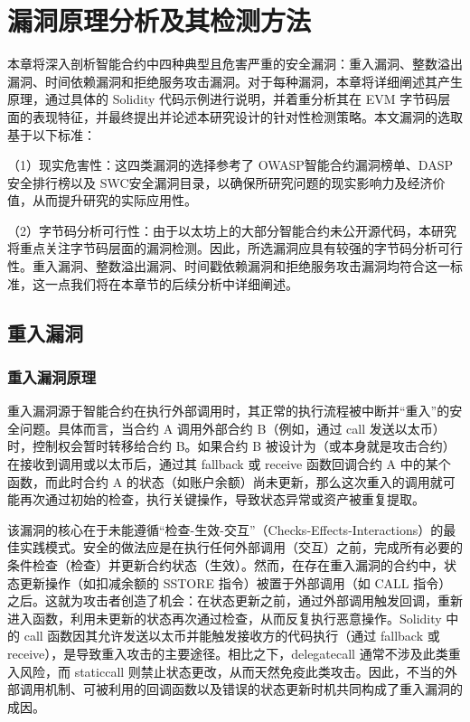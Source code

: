 \documentclass[print, master, vlined, timesmath]{DissertUESTC}
\begin{document}
\chapter{漏洞原理分析及其检测方法}
本章将深入剖析智能合约中四种典型且危害严重的安全漏洞：重入漏洞、整数溢出漏洞、时间依赖漏洞和拒绝服务攻击漏洞。对于每种漏洞，本章将详细阐述其产生原理，通过具体的 Solidity 代码示例进行说明，并着重分析其在 EVM 字节码层面的表现特征，并最终提出并论述本研究设计的针对性检测策略。本文漏洞的选取基于以下标准：

（1）现实危害性：这四类漏洞的选择参考了 OWASP智能合约漏洞榜单\cite{owasp}、DASP安全排行榜\cite{dasp}以及 SWC安全漏洞目录\cite{swc}，以确保所研究问题的现实影响力及经济价值，从而提升研究的实际应用性。

（2）字节码分析可行性：由于以太坊上的大部分智能合约未公开源代码，本研究将重点关注字节码层面的漏洞检测。因此，所选漏洞应具有较强的字节码分析可行性。重入漏洞、整数溢出漏洞、时间戳依赖漏洞和拒绝服务攻击漏洞均符合这一标准，这一点我们将在本章节的后续分析中详细阐述。




\section{重入漏洞}

\subsection{重入漏洞原理}

重入漏洞源于智能合约在执行外部调用时，其正常的执行流程被中断并“重入”的安全问题。具体而言，当合约 A 调用外部合约 B（例如，通过 call 发送以太币）时，控制权会暂时转移给合约 B。如果合约 B 被设计为（或本身就是攻击合约）在接收到调用或以太币后，通过其 fallback 或 receive 函数回调合约 A 中的某个函数，而此时合约 A 的状态（如账户余额）尚未更新，那么这次重入的调用就可能再次通过初始的检查，执行关键操作，导致状态异常或资产被重复提取。

该漏洞的核心在于未能遵循“检查-生效-交互”（Checks-Effects-Interactions）的最佳实践模式。安全的做法应是在执行任何外部调用（交互）之前，完成所有必要的条件检查（检查）并更新合约状态（生效）。然而，在存在重入漏洞的合约中，状态更新操作（如扣减余额的 SSTORE 指令）被置于外部调用（如 CALL 指令）之后。这就为攻击者创造了机会：在状态更新之前，通过外部调用触发回调，重新进入函数，利用未更新的状态再次通过检查，从而反复执行恶意操作。Solidity 中的 call 函数因其允许发送以太币并能触发接收方的代码执行（通过 fallback 或 receive），是导致重入攻击的主要途径。相比之下，delegatecall 通常不涉及此类重入风险，而 staticcall 则禁止状态更改，从而天然免疫此类攻击。因此，不当的外部调用机制、可被利用的回调函数以及错误的状态更新时机共同构成了重入漏洞的成因。
\end{document}
